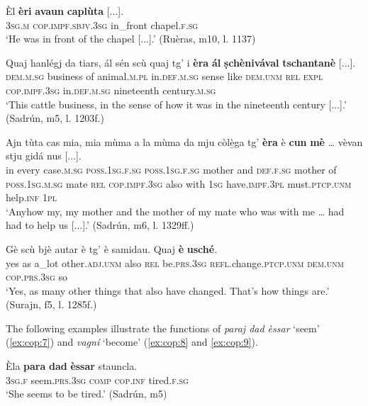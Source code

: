\ea
\label{ex:cop:3}
\gll  Èl \textbf{èri} \textbf{avaun} \textbf{caplùta} [...].\\
\textsc{3sg.m} \textsc{cop.impf.sbjv.3sg} in\_front chapel.\textsc{f.sg}\\
\glt `He was in front of the chapel [...].' (Ruèras, m10, l. 1137)
\z

\ea
\label{ex:cop:4}
\gll Quaj hanlégj da tiars, ál sén scù quaj tg' i \textbf{èra} \textbf{ál} \textbf{ṣchènivával} \textbf{tschantanè} [...].\\
	\textsc{dem.m.sg} business of animal.\textsc{m.pl} in.\textsc{def.m.sg} sense like \textsc{dem.unm} \textsc{rel} \textsc{expl} \textsc{cop.impf.3sg} in.\textsc{def.m.sg} nineteenth century.\textsc{m.sg}\\
\glt`This cattle business, in the sense of how it was in the nineteenth century [...].' (Sadrún, m5, l. 1203f.)
\z

\ea
\label{ex:cop:6}
\gll    Ajn tùta cas mia, mia mùma a la mùma da mju còlè̱ga tg’ \textbf{èra} è \textbf{cun} \textbf{mè} … vèvan stju gidá nus [...].\\
in every case.\textsc{m.sg} \textsc{poss.1sg.f.sg}  \textsc{poss.1sg.f.sg} mother and \textsc{def.f.sg} mother of  \textsc{poss.1sg.m.sg} mate \textsc{rel}  \textsc{cop.impf.3sg} also with \textsc{1sg} {} have.\textsc{impf.3pl} must.\textsc{ptcp.unm} help.\textsc{inf} \textsc{1pl}\\
\glt `Anyhow my, my mother and the mother of my mate who was with me … had had to help us [...].' (Sadrún, m6, l. 1329ff.)
\z

\ea
\label{ex:cop:5}
\gll    Gè scù bjè autar è tg’ è samidau. Quaj \textbf{è} \textbf{usché}.\\
yes as a\_lot other.\textsc{adj.unm} also \textsc{rel} be.\textsc{prs.3sg} \textsc{refl.}change.\textsc{ptcp.unm}  \textsc{dem.unm} \textsc{cop.prs.3sg} so\\
\glt `Yes, as many other things that also have changed. That’s how things are.' (Surajn, f5, l. 1285f.)
\z

The following examples illustrate the functions of \textit{paraj dad èssar} `seem' (\ref{ex:cop:7}) and \textit{vagní} `become' (\ref{ex:cop:8} and \ref{ex:cop:9}).

\ea
\label{ex:cop:7}
\gll Èla \textbf{para} \textbf{dad} \textbf{èssar} stauncla.   \\
\textsc{3sg.f} seem.\textsc{prs.3sg} \textsc{comp} \textsc{cop.inf} tired.\textsc{f.sg} \\
\glt `She seems to be tired.' (Sadrún, m5)
\z

